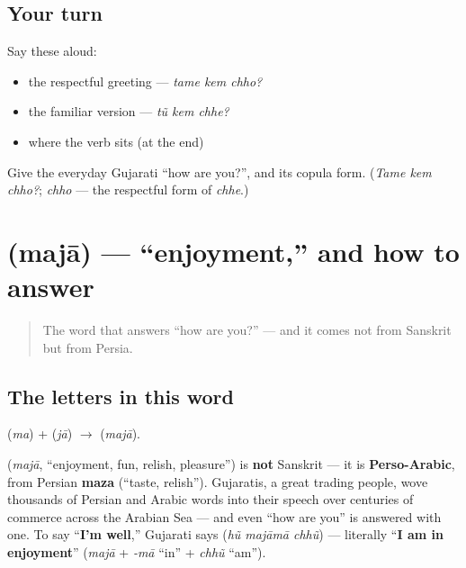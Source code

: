\subsection*{Your turn}
Say these aloud:

\begin{itemize}
\raggedright
  \item the respectful greeting — \emph{tame kem chho?}
  \item the familiar version — \emph{tũ kem chhe?}
  \item where the verb sits (at the end)
\end{itemize}

\begin{tcolorbox}[breakable,colback=teal!4,colframe=teal!35!black,title={Before you move on}]
Give the everyday Gujarati \textquotedblleft{}how are you?\textquotedblright{}, and its copula form. (\emph{Tame kem chho?}; \emph{chho} — the respectful form of \emph{chhe}.)
\end{tcolorbox}
\section[\gu{મજા}]{ (majā) — \textquotedblleft{}enjoyment,\textquotedblright{} and how to answer}

\label{lesson:GU-C03-majaa}



\begin{quote}
The word that answers \textquotedblleft{}how are you?\textquotedblright{} — and it comes not from Sanskrit but from Persia.
\end{quote}

\subsection*{The letters in this word}
\textbf{} (\emph{ma}) + \textbf{} (\emph{jā}) $\to$ \textbf{} (\emph{majā}).

\begin{cousinweb}
\textbf{} (\emph{majā}, \textquotedblleft{}enjoyment, fun, relish, pleasure\textquotedblright{}) is \textbf{not} Sanskrit — it is \textbf{Perso-Arabic}, from Persian \textbf{maza} (\textquotedblleft{}taste, relish\textquotedblright{}). Gujaratis, a great trading people, wove thousands of Persian and Arabic words into their speech over centuries of commerce across the Arabian Sea — and even \textquotedblleft{}how are you\textquotedblright{} is answered with one. To say \textquotedblleft{}\textbf{I'm well},\textquotedblright{} Gujarati says \textbf{  } (\emph{hũ majāmā chhũ}) — literally \textquotedblleft{}\textbf{I am in enjoyment}\textquotedblright{} (\emph{majā} + \emph{-mā} \textquotedblleft{}in\textquotedblright{} + \emph{chhũ} \textquotedblleft{}am\textquotedblright{}).
\end{cousinweb}

